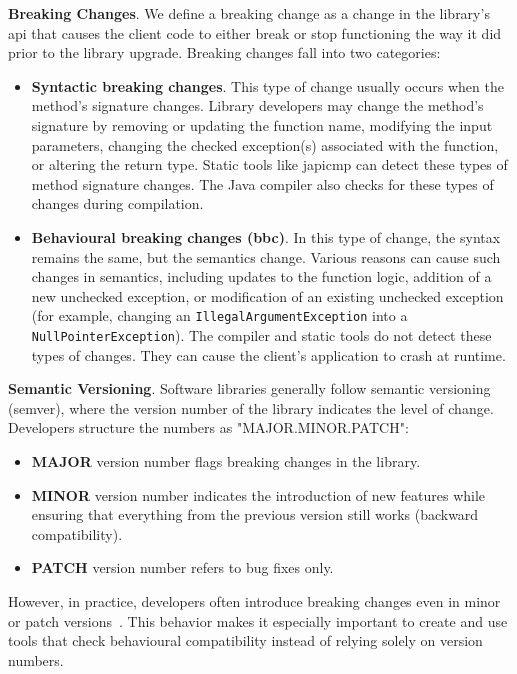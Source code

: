 \textbf{Breaking Changes}. We define a breaking change as a change in the library's \gls{api} that causes the client code to either break or stop functioning the way it did prior to the library upgrade. Breaking changes fall into two categories:
\begin{itemize}
    \item \textbf{Syntactic breaking changes}. This type of change usually occurs when the method's signature changes. Library developers may change the method's signature by removing or updating the function name, modifying the input parameters, changing the checked exception(s) associated with the function, or altering the return type. Static tools like japicmp can detect these types of method signature changes. The Java compiler also checks for these types of changes during compilation.
    \item \textbf{Behavioural breaking changes (\gls{bbc})}. In this type of change, the syntax remains the same, but the semantics change. Various reasons can cause such changes in semantics, including updates to the function logic, addition of a new unchecked exception, or modification of an existing unchecked exception (for example, changing an \texttt{IllegalArgumentException} into a \texttt{NullPointerException}). The compiler and static tools do not detect these types of changes. They can cause the client's application to crash at runtime.
\end{itemize}

\textbf{Semantic Versioning}. Software libraries generally follow semantic versioning (semver), where the version number of the library indicates the level of change. Developers structure the numbers as "MAJOR.MINOR.PATCH":
\begin{itemize}
    \item \textbf{MAJOR} version number flags breaking changes in the library.
    \item \textbf{MINOR} version number indicates the introduction of new features while ensuring that everything from the previous version still works (backward compatibility).
    \item \textbf{PATCH} version number refers to bug fixes only.
\end{itemize}
However, in practice, developers often introduce breaking changes even in minor or patch versions~\cite{jayasuriya24:_under_apis}. This behavior makes it especially important to create and use tools that check behavioural compatibility instead of relying solely on version numbers.

